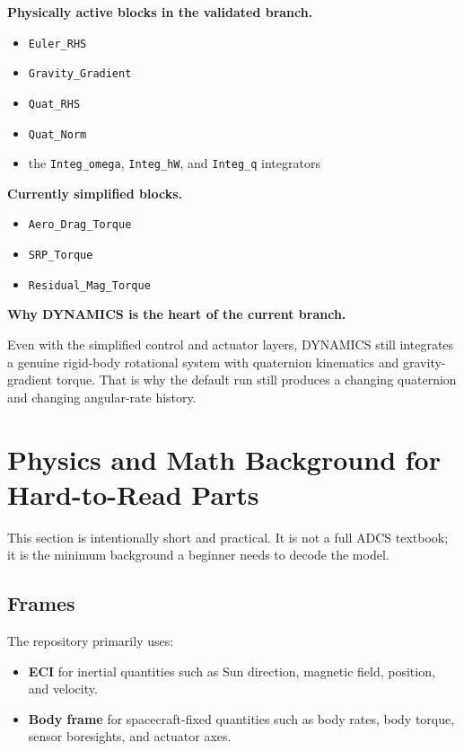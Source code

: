 \documentclass[11pt]{article}
\begin{document}
\textbf{Physically active blocks in the validated branch.}

\begin{itemize}
\item \texttt{Euler\_RHS}
\item \texttt{Gravity\_Gradient}
\item \texttt{Quat\_RHS}
\item \texttt{Quat\_Norm}
\item the \texttt{Integ\_omega}, \texttt{Integ\_hW}, and \texttt{Integ\_q} integrators
\end{itemize}

\textbf{Currently simplified blocks.}

\begin{itemize}
\item \texttt{Aero\_Drag\_Torque}
\item \texttt{SRP\_Torque}
\item \texttt{Residual\_Mag\_Torque}
\end{itemize}

\textbf{Why DYNAMICS is the heart of the current branch.}

Even with the simplified control and actuator layers, DYNAMICS still integrates a genuine rigid-body rotational system with quaternion kinematics and gravity-gradient torque. That is why the default run still produces a changing quaternion and changing angular-rate history.

\section{Physics and Math Background for Hard-to-Read Parts}

This section is intentionally short and practical. It is not a full ADCS textbook; it is the minimum background a beginner needs to decode the model.

\subsection{Frames}

The repository primarily uses:

\begin{itemize}
\item \textbf{ECI} for inertial quantities such as Sun direction, magnetic field, position, and velocity.
\item \textbf{Body frame} for spacecraft-fixed quantities such as body rates, body torque, sensor boresights, and actuator axes.
\end{itemize}
\end{document}
